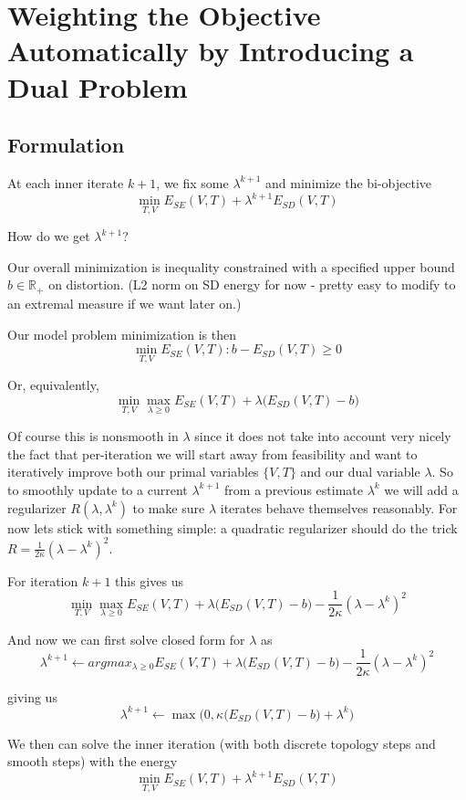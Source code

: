 \section{Weighting the Objective Automatically by Introducing a Dual Problem}
\label{sec:self_weighting}

\subsection{Formulation}
At each inner iterate $k+1$, we fix some $\lambda^{k+1}$ and minimize the bi-objective 
\[ \min_{T,V} E_{SE}(V,T) + \lambda^{k+1} E_{SD}(V,T) \]

How do we get $\lambda^{k+1}$? 

Our overall minimization is inequality constrained with a specified upper bound $b \in \mathbb{R}_+$ on distortion. (L2 norm on SD  energy for now - pretty easy to modify to an extremal measure if we want later on.)

Our model problem minimization is then 
\[ \min_{T,V} E_{SE}(V,T) :  b - E_{SD}(V,T) \geq 0 \]

Or, equivalently,
\[ \min_{T,V} \max_{\lambda \geq 0} E_{SE}(V,T) + \lambda \big( E_{SD}(V,T) - b\big) \]

Of course this is nonsmooth in $\lambda$ since it does not take into account very nicely the fact that per-iteration we will start away from feasibility and want to iteratively improve both our primal variables $\{V,T\}$ and our dual variable $\lambda$.  So to smoothly update to a current $\lambda^{k+1}$ from a previous estimate $\lambda^k$ we will add a regularizer $R(\lambda,\lambda^k)$ to make sure $\lambda$ iterates behave themselves reasonably. For now lets stick with something simple: a quadratic regularizer should do the trick  $R =\frac{1}{2\kappa} (\lambda- \lambda^k)^2$. 

For iteration $k+1$ this gives us 
\[ \min_{T,V} \max_{\lambda \geq 0} E_{SE}(V,T) + \lambda \big( E_{SD}(V,T) - b\big) - \frac{1}{2\kappa} (\lambda- \lambda^k)^2 \]

And now we can first solve closed form for $\lambda$ as 
\[ \lambda^{k+1} \leftarrow argmax_{\lambda \geq 0} E_{SE}(V,T) + \lambda \big( E_{SD}(V,T) - b\big) - \frac{1}{2\kappa} (\lambda- \lambda^k)^2 \]

giving us 
\[ \lambda^{k+1} \leftarrow \max\big(0,\kappa \big( E_{SD}(V,T) -b \big) + \lambda^k\big) \]

We then can solve the inner iteration (with both discrete topology steps and smooth steps) with the energy 
\[ \min_{T,V}  E_{SE}(V,T) + \lambda^{k+1}  E_{SD}(V,T) \]

